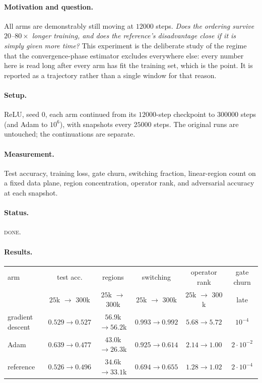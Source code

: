 \documentclass{article} %
\theoremstyle{plain}
\theoremstyle{definition}
\theoremstyle{remark}
\begin{document}
\paragraph{Motivation and question.}
All arms are demonstrably still moving at $12000$ steps. \emph{Does the ordering survive $20$--$80
\times$ longer training, and does the reference's disadvantage close if it is simply given more
time?} This experiment is the deliberate study of the regime that the convergence-phase estimator
excludes everywhere else: every number here is read long after every arm has fit the training set,
which is the point. It is reported as a trajectory rather than a single window for that reason.

\paragraph{Setup.}
ReLU, seed $0$, each arm continued from its $12000$-step checkpoint to $300000$ steps (and Adam to
$10^6$), with snapshots every $25000$ steps. The original runs are untouched; the continuations are
separate.

\paragraph{Measurement.}
Test accuracy, training loss, gate churn, switching fraction, linear-region count on a fixed data
plane, region concentration, operator rank, and adversarial accuracy at each snapshot.

\paragraph{Status.} \textsc{done}.

\paragraph{Results.}

\begin{center}\small
\begin{tabular}{lccccc}
\toprule
arm & test acc. & regions & switching & operator rank & gate churn \\
 & $25$k $\to$ $300$k & $25$k $\to$ $300$k & $25$k $\to$ $300$k & $25$k $\to$ $300$k & late \\
\midrule
gradient descent & $0.529 \to 0.527$ & $56.9$k $\to 56.2$k & $0.993 \to 0.992$ & $5.68 \to 5.72$ & $10^{-4}$ \\
Adam             & $0.639 \to 0.477$ & $43.0$k $\to 26.3$k & $0.925 \to 0.614$ & $2.14 \to 1.00$ & $2\cdot10^{-2}$ \\
reference        & $0.526 \to 0.496$ & $34.6$k $\to 33.1$k & $0.694 \to 0.655$ & $1.28 \to 1.02$ & $2\cdot10^{-4}$ \\
\bottomrule
\end{tabular}
\end{center}
\end{document}
